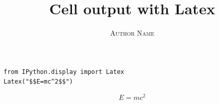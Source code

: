 \documentclass[a4paper,11pt,oneside]{book}
\title{\Huge \textbf{Cell output with Latex}}
\author{\textsc{Author Name}}
\begin{document}
\sloppy

\frontmatter
\maketitle

\tableofcontents

\mainmatter

% 
% 

\begin{verbatim}
from IPython.display import Latex
Latex("$$E=mc^2$$")
\end{verbatim}

\begin{equation}
E=mc^2
\end{equation}
\end{document}
